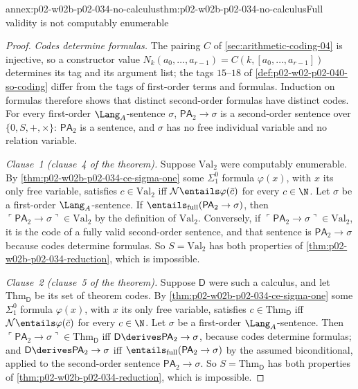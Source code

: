 \begin{annexitem}{annex:p02-w02b-p02-034-no-calculus}{thm:p02-w02b-p02-034-no-calculus}{Full validity is not computably enumerable}
\begin{proof}
\emph{Codes determine formulas.}  The pairing \(C\) of
\cref{sec:arithmetic-coding-04} is injective, so a constructor value
\(N_k(a_0,\ldots,a_{r-1})=C(k,[a_0,\ldots,a_{r-1}])\) determines its tag and
its argument list; the tags \(15\)--\(18\) of
\cref{def:p02-w02-p02-040-so-coding} differ from the tags of first-order
terms and formulas.  Induction on formulas therefore shows that distinct
second-order formulas have distinct codes.  For every first-order
\(\Lang_A\)-sentence \(\sigma\), \(\mathsf{PA}_2\to\sigma\) is a second-order
sentence over \(\{0,S,+,\times\}\): \(\mathsf{PA}_2\) is a sentence, and
\(\sigma\) has no free individual variable and no relation variable.

\emph{Clause~1 (clause~4 of the theorem).}  Suppose \(\mathrm{Val}_2\) were
computably enumerable.  By \cref{thm:p02-w02b-p02-034-ce-sigma-one} some
\(\Sigma^0_1\) formula \(\varphi(x)\), with \(x\) its only free variable,
satisfies \(c\in\mathrm{Val}_2\) iff \(\mathcal N\entails\varphi(\bar c)\)
for every \(c\in\N\).  Let \(\sigma\) be a first-order \(\Lang_A\)-sentence.
If \(\entails_{\mathrm{full}}(\mathsf{PA}_2\to\sigma)\), then
\(\ulcorner\mathsf{PA}_2\to\sigma\urcorner\in\mathrm{Val}_2\) by the
definition of \(\mathrm{Val}_2\).  Conversely, if
\(\ulcorner\mathsf{PA}_2\to\sigma\urcorner\in\mathrm{Val}_2\), it is the code
of a fully valid second-order sentence, and that sentence is
\(\mathsf{PA}_2\to\sigma\) because codes determine formulas.  So
\(S=\mathrm{Val}_2\) has both properties of
\cref{thm:p02-w02b-p02-034-reduction}, which is impossible.

\emph{Clause~2 (clause~5 of the theorem).}  Suppose \(\mathsf D\) were such a
calculus, and let \(\mathrm{Thm}_{\mathsf D}\) be its set of theorem codes.
By \cref{thm:p02-w02b-p02-034-ce-sigma-one} some \(\Sigma^0_1\) formula
\(\varphi(x)\), with \(x\) its only free variable, satisfies
\(c\in\mathrm{Thm}_{\mathsf D}\) iff \(\mathcal N\entails\varphi(\bar c)\)
for every \(c\in\N\).  Let \(\sigma\) be a first-order
\(\Lang_A\)-sentence.  Then
\(\ulcorner\mathsf{PA}_2\to\sigma\urcorner\in\mathrm{Thm}_{\mathsf D}\) iff
\(\mathsf D\derives\mathsf{PA}_2\to\sigma\), because codes determine
formulas; and \(\mathsf D\derives\mathsf{PA}_2\to\sigma\) iff
\(\entails_{\mathrm{full}}(\mathsf{PA}_2\to\sigma)\) by the assumed
biconditional, applied to the second-order sentence
\(\mathsf{PA}_2\to\sigma\).  So \(S=\mathrm{Thm}_{\mathsf D}\) has both
properties of \cref{thm:p02-w02b-p02-034-reduction}, which is impossible.
\end{proof}
\end{annexitem}
